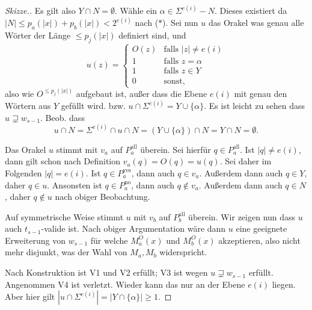 \documentclass[nofonts]{uebung}
\theoremstyle{definition}
\begin{document}
\begin{proof}[Skizze.]
    Es gilt also $Y\cap N =\emptyset$. Wähle ein $\alpha\in \Sigma^{e(i)}-N$. Dieses existiert da $|N|\leq p_a(|x|)+p_b(|x|)<2^{e(i)}$ nach ($\ast$).
    Sei nun $u$ das Orakel was genau alle Wörter der Länge $\leq p_j(|x|)$ definiert sind, und
    \[ u(z)= \begin{cases} O(z) & \text{falls $|z|\neq e(i)$}\\ 1 & \text{falls $z=\alpha$} \\1 & \text{falls $z\in Y$} \\ 0&\text{sonst,} \end{cases}
    \]
    also wie $O^{\leq p_j(|x|)}$ aufgebaut ist, außer dass die Ebene $e(i)$ mit genau den Wörtern aus $Y$ gefüllt wird. bzw. $u\cap\Sigma^{e(i)} = Y\cup \{\alpha\}$.
    Es ist leicht zu sehen dass $u\sqsupsetneq w_{s-1}$.
    Beob. dass 
    \[ u\cap N = \Sigma^{e(i)}\cap u \cap N = (Y\cup \{\alpha\}) \cap N= Y\cap N=\emptyset.\]

    Das Orakel $u$ stimmt mit $v_a$ auf $P^\mathrm{all}_a$ überein. Sei hierfür $q\in P^\mathrm{all}_a$.
    Ist $|q|\neq e(i)$, dann gilt schon nach Definition $v_a(q)=O(q)=u(q)$. Sei daher im Folgenden $|q|=e(i)$.
    Ist $q\in P^\mathrm{yes}_a$, dann auch $q\in v_a$. Außerdem dann auch $q\in Y$, daher $q\in u$.
    Ansonsten ist $q\in P^\mathrm{no}_a$, dann auch $q\not\in v_a$. Außerdem dann auch $q\in N$, daher $q\not\in u$ nach obiger Beobachtung.
    
    Auf symmetrische Weise stimmt $u$ mit $v_b$ auf $P^\mathrm{all}_b$ überein.
    Wir zeigen nun dass $u$ auch $t_{s-1}$-valide ist.
    Nach obiger Argumentation wäre dann $u$ eine geeignete Erweiterung von $w_{s-1}$ für welche $M_a^O(x)$ und $M_b^O(x)$ akzeptieren, also nicht mehr disjunkt, was der Wahl von $M_a, M_b$ widerspricht.

    Nach Konstruktion ist V1 und V2 erfüllt; V3 ist wegen $u\sqsupsetneq w_{s-1}$ erfüllt.
    Angenommen V4 ist verletzt.
    Wieder kann das nur an der Ebene $e(i)$ liegen.
    Aber hier gilt $|u\cap\Sigma^{e(i)}|=|Y\cap\{\alpha\}|\geq 1$.
\end{proof}
\end{document}
